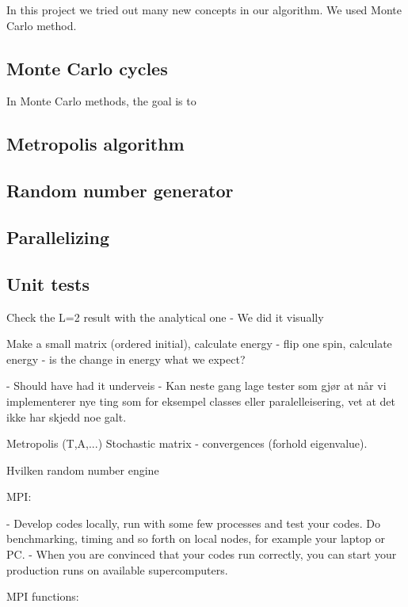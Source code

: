 In this project we tried out many new concepts in our algorithm. We used Monte Carlo method. 


\subsection{Monte Carlo cycles}

In Monte Carlo methods, the goal is to 





\subsection{Metropolis algorithm}

\subsection{Random number generator}

\subsection{Parallelizing}

\subsection{Unit tests}

Check the L=2 result with the analytical one
 - We did it visually

Make a small matrix (ordered initial), calculate energy - flip one spin, calculate energy - is the change in energy what we expect? 

 - Should have had it underveis
 - Kan neste gang lage tester som gjør at når vi implementerer nye ting som for eksempel classes eller paralelleisering, vet at det ikke har skjedd noe galt.




Metropolis (T,A,...)
	Stochastic matrix  - convergences (forhold eigenvalue).
	
	Hvilken random number engine
	
MPI:	
	
- Develop codes locally, run with some few processes and test your codes. Do benchmarking, timing and so forth on local nodes, for example your laptop or PC.
- When you are convinced that your codes run correctly, you can start your production runs on available supercomputers.
	
	
MPI functions:
%
%
%
%
%
%
%
